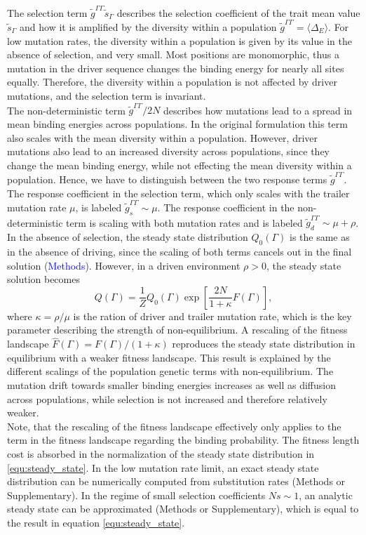 \documentclass[10pt,a4paper]{article}
\begin{document}
	The selection term $\tilde{g}^{\Gamma\Gamma}\tilde{s}_\Gamma$ describes the selection coefficient of the trait mean value $\tilde{s}_\Gamma$ and how it is amplified by the diversity within a population $\tilde{g}^{\Gamma\Gamma}=\langle\Delta_E\rangle $. For low mutation rates, the diversity within a population is given by its value in the absence of selection, and very small. Most positions are monomorphic, thus a mutation in the driver sequence changes the binding energy for nearly all sites equally. Therefore, the diversity within a population is not affected by driver mutations, and the selection term is invariant.\\
	The non-deterministic term $\tilde{g}^{\Gamma\Gamma}/2N$ describes how mutations lead to a spread in mean binding energies across populations. In the original formulation this term also scales with the mean diversity within a population. However, driver mutations also lead to an increased diversity across populations, since they change the mean binding energy, while not effecting the mean diversity within a population. Hence, we have to distinguish between the two response terms $\tilde{g}^{\Gamma\Gamma}$. The response coefficient in the selection term, which only scales with the trailer mutation rate $\mu$, is labeled $\tilde{g}^{\Gamma\Gamma}_s\sim\mu$. The response coefficient in the non-deterministic term is scaling with both mutation rates and is labeled $\tilde{g}^{\Gamma\Gamma}_d\sim\mu+\rho$.\\
	In the absence of selection, the steady state distribution $Q_0(\Gamma)$ is the same as in the absence of driving, since the scaling of both terms cancels out in the final solution (\textcolor{blue}{Methods}). However, in a driven environment $\rho>0$, the steady state solution becomes
	\begin{equation}
		Q(\Gamma)=\frac{1}{Z}Q_0(\Gamma)\exp\left[\frac{2N}{1+\kappa}F(\Gamma)\right],\label{equ:steady_state}
	\end{equation}
	where $\kappa=\rho/\mu$ is the ration of driver and trailer mutation rate, which is the key parameter describing the strength of non-equilibrium. A rescaling of the fitness landscape $\hat{F}(\Gamma)=F(\Gamma)/(1+\kappa)$ reproduces the steady state distribution in equilibrium with a weaker fitness landscape. This result is explained by the different scalings of the population genetic terms with non-equilibrium. The mutation drift towards smaller binding energies increases as well as diffusion across populations, while selection is not increased and therefore relatively weaker.\\
	Note, that the rescaling of the fitness landscape effectively only applies to the term in the fitness landscape regarding the binding probability. The fitness length cost is absorbed in the normalization of the steady state distribution in \ref{equ:steady_state}.
	In the low mutation rate limit, an exact steady state distribution can be numerically computed from substitution rates (Methods or Supplementary). In the regime of small selection coefficients $Ns\sim1$, an analytic steady state can be approximated (Methods or Supplementary), which is equal to the result in equation \ref{equ:steady_state}.
\end{document}
